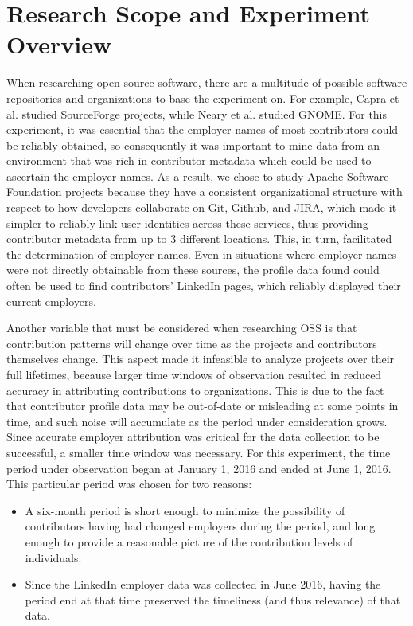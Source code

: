 \section{Research Scope and Experiment Overview}
When researching open source software, there are a multitude of possible software repositories and organizations to base the experiment on. For example, Capra et al.\cite{capra2009survey} studied SourceForge projects, while Neary et al.\cite{neary2010gnome} studied GNOME. 
 
For this experiment, it was essential that the employer names of most contributors could be reliably obtained, so consequently it was important to mine data from an environment that was rich in contributor metadata which could be used to ascertain the employer names. As a result, we chose to study Apache Software Foundation projects because they have a consistent organizational structure with respect to how developers collaborate on Git, Github, and JIRA, which made it simpler to reliably link user identities across these services, thus providing contributor metadata from up to 3 different locations. This, in turn, facilitated the determination of employer names. Even in situations where employer names were not directly obtainable from these sources, the profile data found could often be used to find contributors' LinkedIn pages, which reliably displayed their current employers.

Another variable that must be considered when researching OSS is that contribution patterns will change over time as the projects and contributors themselves change. This aspect made it infeasible to analyze projects over their full lifetimes, because larger time windows of observation resulted in reduced accuracy in attributing contributions to organizations. This is due to the fact that contributor profile data may be out-of-date or misleading at some points in time, and such noise will accumulate as the period under consideration grows. Since accurate employer attribution was critical for the data collection to be successful, a smaller time window was necessary. For this experiment, the time period \timeperiod{} under observation began at January 1, 2016 and ended at June 1, 2016. This particular period was chosen for two reasons:
\begin{itemize}
	\item A six-month period is short enough to minimize the possibility of contributors having had changed employers during the period, and long enough to provide a reasonable picture of the contribution levels of individuals.
	\item Since the LinkedIn employer data was collected in June 2016, having the period end at that time preserved the timeliness (and thus relevance) of that data.
\end{itemize}


